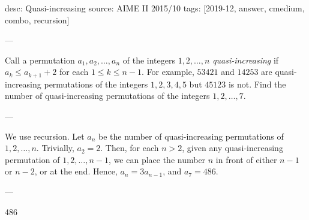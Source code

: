 desc: Quasi-increasing
source: AIME II 2015/10
tags: [2019-12, answer, cmedium, combo, recursion]

---

Call a permutation $a_1,a_2,\ldots,a_n$ of the integers $1,2,\ldots,n$ \emph{quasi-increasing} if $a_k\le a_{k+1}+2$ for each $1\le k\le n-1$. For example, $53421$ and $14253$ are quasi-increasing permutations of the integers $1,2,3,4,5$ but $45123$ is not. Find the number of quasi-increasing permutations of the integers $1,2,\ldots,7$.

---

We use recursion. Let $a_n$ be the number of quasi-increasing permutations of $1,2,\ldots,n$. Trivially, $a_2=2$. Then, for each $n>2$, given any quasi-increasing permutation of $1,2,\ldots,n-1$, we can place the number $n$ in front of either $n-1$ or $n-2$, or at the end. Hence, $a_n=3a_{n-1}$, and $a_7=486$.

---

486
